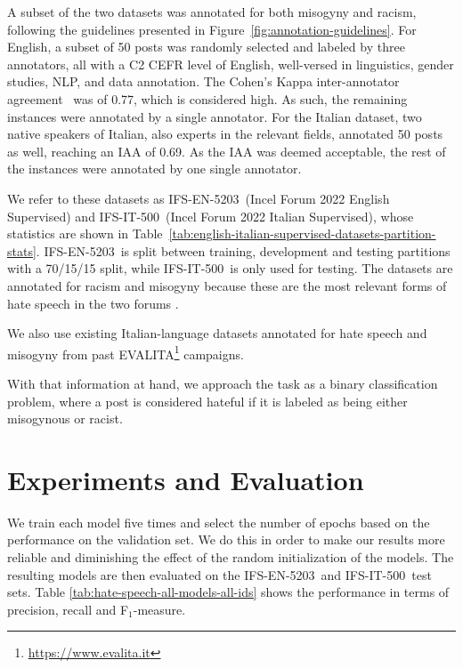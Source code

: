 \documentclass[11pt]{article}
\newcommand{\dsENclassification}{IFS-EN-5203}
\newcommand{\dsITclassification}{IFS-IT-500}
\begin{document}
A subset of the two datasets was annotated for both misogyny and racism, following the guidelines presented in Figure~\ref{fig:annotation-guidelines}.
For English, a subset of 50 posts was randomly selected and labeled by three annotators, all with a C2 CEFR level of English, well-versed in linguistics, gender studies, NLP, and data annotation. 
The Cohen's Kappa inter-annotator agreement~\cite{bobicev2017inter} was of 0.77, which is considered high.
As such, the remaining instances were annotated by a single annotator. For the Italian dataset, two native speakers of Italian, also experts in the relevant fields, annotated  50 posts as well, reaching an IAA of 0.69. As the IAA was deemed acceptable, the rest of the instances were annotated by one single annotator. 

We refer to these datasets as \dsENclassification\, (Incel Forum 2022 English Supervised) and \dsITclassification\, (Incel Forum 2022 Italian Supervised), 
whose statistics are shown in 
Table~\ref{tab:english-italian-supervised-datasets-partition-stats}. \dsENclassification~is split between training, development and testing partitions with a 70/15/15 split, while \dsITclassification~is only used for testing.
The datasets are annotated for racism and misogyny because these are the most relevant forms of hate speech in the two forums \cite{silva2016analyzing,ging2018special}.

We also use existing Italian-language datasets annotated for hate speech \cite{boscoOverviewEVALITA2018} and misogyny \cite{basileEVALITA2020Overview} from past EVALITA\footnote{\url{https://www.evalita.it}} campaigns.

With that information at hand, we approach the task as a binary classification problem, where a post is considered hateful if it is labeled as being either misogynous or racist.

\section{Experiments and Evaluation}
\label{sec:exps}

We train each model five times and select the number of epochs based on the performance on the validation set. We do this in order to make our results more reliable and diminishing the effect of the random initialization of the models. The resulting models are then evaluated on the \dsENclassification\, and \dsITclassification\, test sets.
Table \ref{tab:hate-speech-all-models-all-ids} shows the performance in terms of precision, recall and F$_1$-measure.
\end{document}
